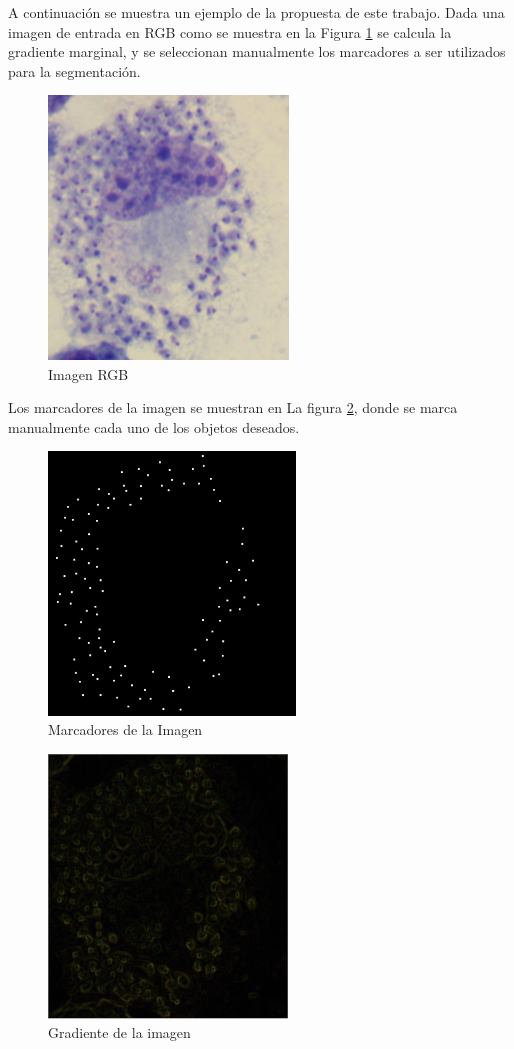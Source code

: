 A continuación se muestra un ejemplo de la propuesta de este trabajo. Dada una imagen de entrada en RGB como se muestra en la Figura \ref{img:imgprop} se calcula la gradiente marginal, y se seleccionan manualmente los marcadores a ser utilizados para la segmentación.
\begin{figure}[h!]
\centering
\includegraphics[height=70mm]{./propuesta/cruzi26.jpg}
\caption{Imagen RGB} 
\label{img:imgprop}
\end{figure}
Los marcadores de la imagen se muestran en La figura \ref{img:imgmark}, donde se marca manualmente cada uno de los objetos deseados.
\begin{figure}[h!]
\centering
\includegraphics[height=70mm]{./propuesta/marcadores.png}
\caption{Marcadores de la Imagen} 
\label{img:imgmark}
\end{figure}
\begin{figure}[h!]
\centering
\includegraphics[height=70mm]{./propuesta/gradiente.png}
\caption{Gradiente de la imagen}
\label{img:imggrad}
\end{figure}

